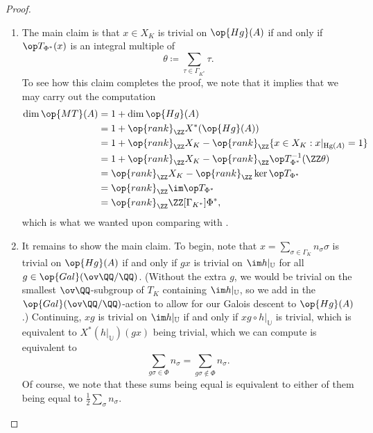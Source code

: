 \documentclass{article}
\begin{document}
\begin{proof}
\begin{enumerate}
		\item The main claim is that $x\in X_K$ is trivial on $\op{Hg}(A)$ if and only if $\op T_{\Phi^*}(x)$ is an integral multiple of
		\[\theta\coloneqq\sum_{\tau\in\Gamma_{K^*}}\tau.\]
		To see how this claim completes the proof, we note that it implies that we may carry out the computation
		\begin{align*}
			\dim\op{MT}(A) &= 1+\dim\op{Hg}(A) \\
			&= 1+\op{rank}_\ZZ X^*(\op{Hg}(A)) \\
			&= 1+\op{rank}_\ZZ X_K-\op{rank}_\ZZ\{x\in X_K:x|_{\mathrm{Hg}(A)}=1\} \\
			&= 1+\op{rank}_\ZZ X_K-\op{rank}_\ZZ\op T_{\Phi^*}^{-1}(\ZZ\theta) \\
			&= \op{rank}_\ZZ X_K-\op{rank}_\ZZ\ker\op T_{\Phi^*} \\
			&= \op{rank}_\ZZ\im \op T_{\Phi^*} \\
			&= \op{rank}_\ZZ\ZZ[\Gamma_{K^*}]\Phi^*,
		\end{align*}
		which is what we wanted upon comparing with .

		\item It remains to show the main claim. To begin, note that $x=\sum_{\sigma\in\Gamma_K}n_\sigma\sigma$ is trivial on $\op{Hg}(A)$ if and only if $gx$ is trivial on $\im h|_{\mathbb U}$ for all $g\in\op{Gal}(\ov\QQ/\QQ)$. (Without the extra $g$, we would be trivial on the smallest $\ov\QQ$-subgroup of $T_K$ containing $\im h|_{\mathbb U}$, so we add in the $\op{Gal}(\ov\QQ/\QQ)$-action to allow for our Galois descent to $\op{Hg}(A)$.) Continuing, $xg$ is trivial on $\im h|_{\mathbb U}$ if and only if $xg\circ h|_{\mathbb U}$ is trivial, which is equivalent to $X^*(h|_{\mathbb U})(gx)$ being trivial, which we can compute is equivalent to
		\[\sum_{g\sigma\in\Phi}n_\sigma=\sum_{g\sigma\notin\Phi}n_\sigma.\]
		Of course, we note that these sums being equal is equivalent to either of them being equal to $\frac12\sum_\sigma n_\sigma$.


\end{enumerate}
\end{proof}
\end{document}

